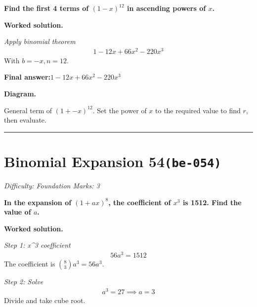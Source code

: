 \documentclass[11pt]{article}
\newcommand{\question}[1]{\par\medskip\noindent\textbf{#1}\par}
\begin{document}
\question{Find the first 4 terms of \( (1 - x)^{12} \) in ascending powers of \( x \).}

\textbf{Worked solution.}

\textit{Apply binomial theorem}
\[\begin{gathered}
1 - 12x + 66x^2 - 220x^3
\end{gathered}\]
With \( b = -x, n = 12 \).

\begin{answerbox}
\textbf{Final answer:}\quad \(\displaystyle 1 - 12x + 66x^2 - 220x^3\)
\end{answerbox}
\textbf{Diagram.}

\begin{center}
\end{center}
\small General term of $\left(1+-x\right)^{12}$. Set the power of $x$ to the required value to find $r$, then evaluate.\normalsize

\medskip\hrule

\section*{Binomial Expansion 54\quad\small\texttt{(be-054)}}
\textit{Difficulty: Foundation \quad\textbar\quad Marks: 3}

\question{In the expansion of \( (1 + ax)^8 \), the coefficient of \( x^3 \) is 1512. Find the value of \( a \).}

\textbf{Worked solution.}

\textit{Step 1: x\textasciicircum 3 coefficient}
\[\begin{gathered}
56a^3 = 1512
\end{gathered}\]
The coefficient is \( \binom{8}{3}a^3 = 56a^3 \).

\textit{Step 2: Solve}
\[\begin{gathered}
a^3 = 27 \implies a = 3
\end{gathered}\]
Divide and take cube root.
\end{document}
